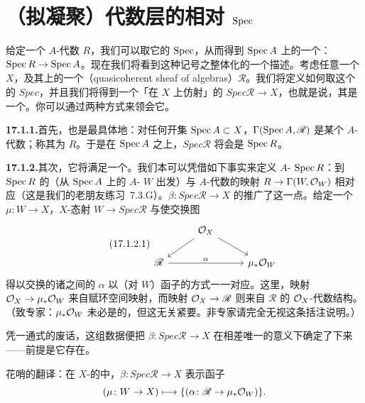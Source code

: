 
\section{（拟凝聚）代数层的相对 $\operatorname{Spec}$}

给定一个 $A$-代数 $R$，我们可以取它的 $\operatorname{Spec}$，从而得到 $\operatorname{Spec} A$ 上的一个\trAffineScheme：$\operatorname{Spec} R\to\operatorname{Spec} A$。现在我们将看到这种记号之整体化的一个\trUniversalProperty{}描述。考虑任意一个\trScheme{} $X$，及其上的一个\trQC{}\trSheafOfAlgebras（quasicoherent sheaf of algebras）$\mathscr{R}$。我们将定义如何取这个\trSheafOfAlgebras{}的 $\mathit{Spec}$，并且我们将得到一个「在 $X$ 上仿射」的\trScheme{} $\mathit{Spec}\mathscr{R}\to X$，也就是说，其\trStructureMorphism{}是一个\trAffine\trMorphism。你可以通过两种方式来领会它。

\textbf{17.1.1.}\quad 首先，也是最具体地：对任何\trAffine{}开集 $\operatorname{Spec} A\subset X$，$\Gamma(\operatorname{Spec} A,\mathscr{R})$ 是某个 $A$-代数；称其为 $R$。于是在 $\operatorname{Spec} A$ 之上，$\mathit{Spec}\mathscr{R}$ 将会是 $\operatorname{Spec} R$。

\textbf{17.1.2.}\quad 其次，它将满足一个\trUniversalProperty。我们本可以凭借如下事实来定义 $A$-\trScheme{} $\operatorname{Spec} R$：到 $\operatorname{Spec} R$ 的\trMorphism（从 $\operatorname{Spec} A$ 上的 $A$-\trScheme{} $W$ 出发）与 $A$-代数的映射 $R\to\Gamma(W,\mathcal{O}_W)$ 相对应（这是我们的老朋友\mbox{练习~7.3.G}）。$\beta\colon\mathit{Spec}\mathscr{R}\to X$ 的\trUniversalProperty{}推广了这一点。给定一个\trMorphism{} $\mu\colon W\to X$，$X$-态射 $W\to\mathit{Spec}\mathscr{R}$ 与使交换图
\begin{equation*}\tag{17.1.2.1}\label{eq:relative-spec-univ-diagram}
\begin{tikzcd}[row sep=1.7em, column sep=2.6em]
& \OO_X \ar[ld] \ar[rd] & \\
\mathscr{R} \ar[rr, "\alpha"] && \mu_*\OO_W
\end{tikzcd}
\end{equation*}
得以交换的诸\trSheafOfAlgebras{}之间的\trMorphism{} $\alpha$ 以（对 $W$）函子的方式一一对应。这里，映射 $\mathcal{O}_X\to\mu_*\mathcal{O}_W$ 来自赋环空间映射，而映射 $\mathcal{O}_X\to\mathscr{R}$ 则来自 $\mathscr{R}$ 的 $\mathcal{O}_X$-代数结构。（致专家：$\mu_*\mathcal{O}_W$ 未必是\trQC{}的，但这无关紧要。非专家请完全无视这条括注说明。）

凭一通\trUniversalProperty{}式的废话，这组数据便把 $\beta\colon\mathit{Spec}\mathscr{R}\to X$ 在相差唯一\trIsomorphism{}的意义下确定了下来——前提是它存在。

花哨的翻译：在 $X$-\trScheme{}的\trCategory{}中，$\beta\colon\mathit{Spec}\mathscr{R}\to X$ 表示函子
\[
(\mu\colon W\to X)\longmapsto\{(\alpha\colon\mathscr{R}\to\mu_*\mathcal{O}_W)\}.
\]


